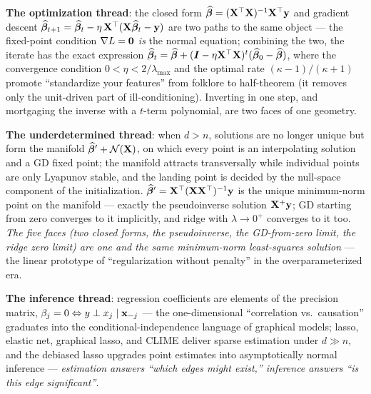 \textbf{The optimization thread}: the closed form $\widehat{\bm{\beta}} = (\mathbf{X}^\top\mathbf{X})^{-1}\mathbf{X}^\top\mathbf{y}$ and gradient descent $\widehat{\bm{\beta}}_{t+1} = \widehat{\bm{\beta}}_t - \eta\,\mathbf{X}^\top(\mathbf{X}\widehat{\bm{\beta}}_t - \mathbf{y})$ are two paths to the same object --- the fixed-point condition $\nabla L = \mathbf{0}$ \emph{is} the normal equation; combining the two, the iterate has the exact expression $\widehat{\bm{\beta}}_t = \widehat{\bm{\beta}} + (\bm{I} - \eta\mathbf{X}^\top\mathbf{X})^t(\widehat{\bm{\beta}}_0 - \widehat{\bm{\beta}})$, where the convergence condition $0 < \eta < 2/\lambda_{\max}$ and the optimal rate $(\kappa-1)/(\kappa+1)$ promote ``standardize your features'' from folklore to half-theorem (it removes only the unit-driven part of ill-conditioning). Inverting in one step, and mortgaging the inverse with a $t$-term polynomial, are two faces of one geometry.

\textbf{The underdetermined thread}: when $d > n$, solutions are no longer unique but form the manifold $\widehat{\bm{\beta}}' + \mathcal{N}(\mathbf{X})$, on which every point is an interpolating solution and a GD fixed point; the manifold attracts transversally while individual points are only Lyapunov stable, and the landing point is decided by the null-space component of the initialization. $\widehat{\bm{\beta}}' = \mathbf{X}^\top(\mathbf{X}\mathbf{X}^\top)^{-1}\mathbf{y}$ is the unique minimum-norm point on the manifold --- exactly the pseudoinverse solution $\mathbf{X}^+\mathbf{y}$; GD starting from zero converges to it implicitly, and ridge with $\lambda \to 0^+$ converges to it too. \textit{The five faces (two closed forms, the pseudoinverse, the GD-from-zero limit, the ridge zero limit) are one and the same minimum-norm least-squares solution} --- the linear prototype of ``regularization without penalty'' in the overparameterized era.

\textbf{The inference thread}: regression coefficients are elements of the precision matrix, $\beta_j = 0 \Leftrightarrow y \perp x_j \mid \mathbf{x}_{-j}$ --- the one-dimensional ``correlation vs.\ causation'' graduates into the conditional-independence language of graphical models\cite{lauritzen1996}; lasso, elastic net, graphical lasso, and CLIME deliver sparse estimation under $d \gg n$, and the debiased lasso upgrades point estimates into asymptotically normal inference --- \textit{estimation answers ``which edges might exist,'' inference answers ``is this edge significant''}\cite{meinshausen2006,zou2005,friedman2008,cai2011,zhang2014,vandegeer2014}.

